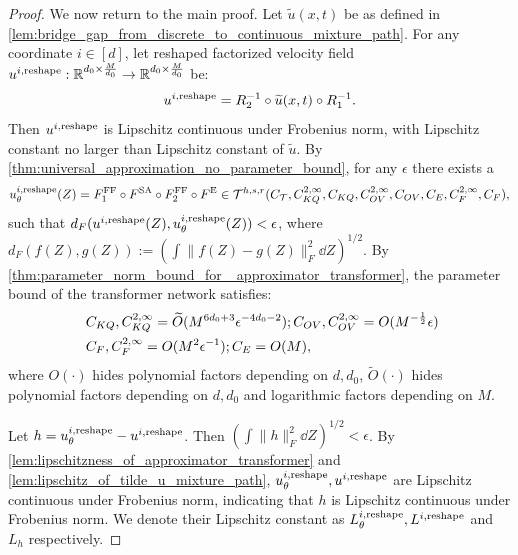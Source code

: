 \documentclass[12pt]{article}
\numberwithin{equation}{section}
\let\tilde\widetilde
\newcommand{\wt}{\widetilde}
\renewcommand{\tilde}{\wt}
\def\R{\mathbb{R}}
\theoremstyle{theoremstyle}
\numberwithin{equation}{section}
\numberwithin{theorem}{section}
\numberwithin{proposition}{section}
\numberwithin{definition}{section}
\numberwithin{lemma}{section}
\numberwithin{assumption}{section}
\numberwithin{remark}{section}
\begin{document}
\begin{proof}
We now return to the main proof.
Let $\tilde{u}(x,t)$ be as defined in \cref{lem:bridge_gap_from_discrete_to_continuous_mixture_path}.
For any coordinate $i \in [d]$, let reshaped factorized velocity field $u^{i, \rm reshape}:\R^{d_0\times \frac{M}{d_0}}\to \R^{d_0\times \frac{M}{d_0}}$ be:
\begin{align*}
    u^{i, \rm reshape}=R_2^{-1}\circ\tilde{u}(x,t)\circ R_1^{-1}.
\end{align*}
Then $ u^{i, \rm reshape}$ is Lipschitz continuous under Frobenius norm, with Lipschitz constant no larger than Lipschitz constant of $\tilde{u}$.
By \cref{thm:universal_approximation_no_parameter_bound}, for any $\epsilon$ there exists a
\begin{align*}
    u_\theta^{i, \rm reshape}(Z)= F^{\rm FF}_1\circ F^{\rm SA}\circ F^{\rm FF}_2\circ F^{\rm E}\in\mathcal{T}^{h,s,r}(C_\mathcal{T},C^{2,\infty}_{KQ},C_{KQ},C^{2,\infty}_{OV},C_{OV},C_{E},C^{2,\infty}_{F},C_{F}),
\end{align*}
such that $d_F(u^{i, \rm reshape}(Z),u_\theta^{i, \rm reshape}(Z))<\epsilon$, where $d_F(f(Z),g(Z)):=(\int\|f(Z)-g(Z)\|^2_F\dd Z)^{1/2}$.
By \cref{thm:parameter_norm_bound_for _approximator_transformer}, the parameter bound of the transformer network satisfies:
\begin{align}\label{eq:bound_of_parameter_main_proof_stat_rate_mixture_path}
    & ~C_{KQ},C^{2,\infty}_{KQ}=\tilde{O}(M^{6d_0+3}\epsilon^{-4d_0-2});C_{OV},C^{2,\infty}_{OV}=O(M^{-\frac{1}{2}}\epsilon) \notag\\
    & ~C_{F},C^{2,\infty}_{F}=O(M^2\epsilon^{-1});C_E=O(M),
\end{align}
where $O(\cdot)$ hides polynomial factors depending on $d,d_0$, $\tilde{O}(\cdot)$ hides polynomial factors depending on $d,d_0$ and logarithmic factors depending on $M$.

Let $h=u_\theta^{i, \rm reshape}-u^{i, \rm reshape}$. 
Then $(\int\|h\|_F^2\dd Z)^{1/2}<\epsilon$.
By \cref{lem:lipschitzness_of_approximator_transformer} and \cref{lem:lipschitz_of_tilde_u_mixture_path}, $u_\theta^{i, \rm reshape},u^{i, \rm reshape}$ are Lipschitz continuous under Frobenius norm, indicating that $h$ is Lipschitz continuous under Frobenius norm.
We denote their Lipschitz constant as $L_\theta^{i, \rm reshape},L^{i, \rm reshape}$ and $L_h$ respectively.


\end{proof}
\end{document}
